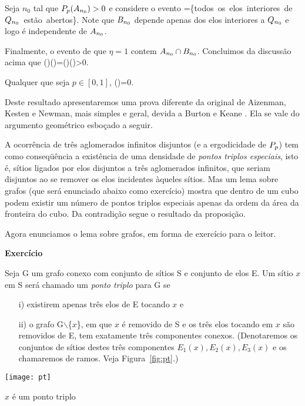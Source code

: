 Seja $n_0$ tal que $P_p(A_{n_0})>0$ e considere o evento 
\beq
\bnu=\{\mbox{todos os elos interiores de $\qnu$ estão abertos}\}.
\eeq
Note que $B_{n_0}$ depende apenas dos elos interiores a $Q_{n_0}$ e logo
é independente de $A_{n_0}$.

Finalmente, o evento de que $\eta=1$ contem $A_{n_0}\cap B_{n_0}$.
Concluimos da discussão acima que
\beq
\p()\geq\p(\anu\cap\bnu)=\p(\anu)\p(\bnu)>0. \bo
\eeq

\vs

\bpro
\label{prop:uni2}
Qualquer que seja $p\in[0,1]$,
\beq
\p(\eta{})=0.
\eeq
\epro

\vs

Deste resultado apresentaremos uma prova
diferente da original de Aizenman, Kesten e Newman, 
mais simples e geral, devida a Burton e Keane \cite{kn:BK}.
Ela se vale do argumento geométrico esboçado a seguir.

A ocorrência de três aglomerados infinitos disjuntos (e a ergodicidade de $P_p$) tem como 
conseqüência a existência de uma densidade de {\em pontos triplos especiais}, isto é, sítios 
ligados por elos disjuntos a três aglomerados infinitos, que seriam disjuntos ao
se remover os elos incidentes àqueles sítios. Mas um lema sobre grafos
(que será enunciado abaixo como exercício) mostra que dentro de um cubo podem existir um número de pontos 
triplos especiais apenas da ordem da área da fronteira do cubo. Da contradição segue o 
resultado da proposição.

Agora enunciamos o lema sobre grafos, em forma de exercício para o leitor.

\vs

{\bf Exercício}

Seja G um grafo conexo com conjunto de sítios S e conjunto de elos E. Um sítio
$x$ em S ser\' a chamado um {\em ponto triplo} para G se

\begin{itemize}
\item[i)] existirem apenas três elos de E tocando $x$ e
\item[ii)] o grafo G$\backslash$\{$x$\}, em que $x$ é removido de S e os três
elos tocando em $x$ são removidos de E, tem exatamente três componentes
conexos. (Denotaremos os conjuntos de sítios destes três componentes
$E_1(x),E_2(x),E_3(x)$ e os chamaremos de ramos. Veja Figura~\ref{fig:pt}.)
\end{itemize}


\bef
%
\texttt{[image: pt]}
\caption{$x$ é um ponto triplo}
\label{fig:pt}
\eef


